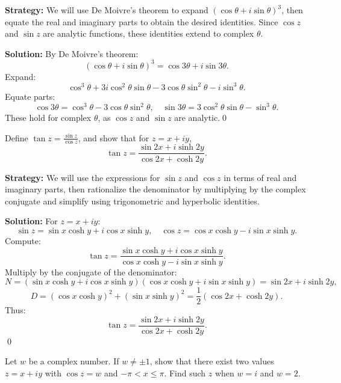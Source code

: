 \noindent\textbf{Strategy:} We will use De Moivre's theorem to expand $(\cos \theta + i \sin \theta)^3$, then equate the real and imaginary parts to obtain the desired identities. Since $\cos z$ and $\sin z$ are analytic functions, these identities extend to complex $\theta$.

\bigskip\noindent\textbf{Solution:}
By De Moivre's theorem:
\[
(\cos \theta + i \sin \theta)^3 = \cos 3\theta + i \sin 3\theta.
\]
Expand:
\[
\cos^3 \theta + 3i \cos^2 \theta \sin \theta - 3 \cos \theta \sin^2 \theta - i \sin^3 \theta.
\]
Equate parts:
\[
\cos 3\theta = \cos^3 \theta - 3 \cos \theta \sin^2 \theta, \quad \sin 3\theta = 3 \cos^2 \theta \sin \theta - \sin^3 \theta.
\]
These hold for complex \( \theta \), as \( \cos z \) and \( \sin z \) are analytic.\qed


\begin{problembox}
\begin{problemstatement}
Define \( \tan z = \frac{\sin z}{\cos z} \), and show that for \( z = x + iy \),
\[
\tan z = \frac{\sin 2x + i \sinh 2y}{\cos 2x + \cosh 2y}.
\]
\end{problemstatement}
\end{problembox}

\noindent\textbf{Strategy:} We will use the expressions for $\sin z$ and $\cos z$ in terms of real and imaginary parts, then rationalize the denominator by multiplying by the complex conjugate and simplify using trigonometric and hyperbolic identities.

\bigskip\noindent\textbf{Solution:}
For \( z = x + iy \):
\[
\sin z = \sin x \cosh y + i \cos x \sinh y, \quad \cos z = \cos x \cosh y - i \sin x \sinh y.
\]
Compute:
\[
\tan z = \frac{\sin x \cosh y + i \cos x \sinh y}{\cos x \cosh y - i \sin x \sinh y}.
\]
Multiply by the conjugate of the denominator:
\[
N = (\sin x \cosh y + i \cos x \sinh y)(\cos x \cosh y + i \sin x \sinh y) = \sin 2x + i \sinh 2y,
\]
\[
D = (\cos x \cosh y)^2 + (\sin x \sinh y)^2 = \frac{1}{2}(\cos 2x + \cosh 2y).
\]
Thus:
\[
\tan z = \frac{\sin 2x + i \sinh 2y}{\cos 2x + \cosh 2y}.
\]\qed


\begin{problembox}
\begin{problemstatement}
Let \( w \) be a complex number. If \( w \ne \pm 1 \), show that there exist two values \( z = x + iy \) with \( \cos z = w \) and \( -\pi < x \leq \pi \). Find such \( z \) when \( w = i \) and \( w = 2 \).
\end{problemstatement}
\end{problembox}

